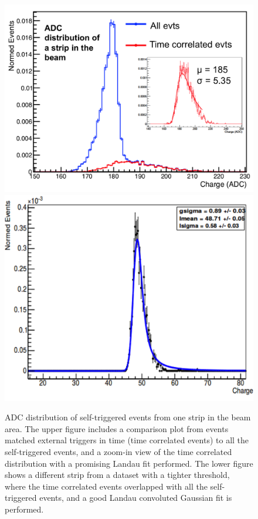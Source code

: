 \documentclass[journal]{IEEEtran}
\begin{document}
\begin{figure}[!ht]%
  \centering
  \includegraphics[width=0.8\linewidth]{pics/Res_pic2.png}\\
  \includegraphics[width=0.78\linewidth]{pics/Res_pic3_1.png}
  \caption{
  ADC distribution of self-triggered events from one strip in the beam area.
  The upper figure includes a comparison plot from events matched external triggers in time (time correlated events) to all the self-triggered events,
  and a zoom-in view of the time correlated distribution with a promising Landau fit performed.
  The lower figure shows a different strip from a dataset with a tighter threshold, where the time correlated events overlapped with all the self-triggered events,
  and a good Landau convoluted Gaussian fit is performed.
  }%
\label{fig:res2}%
\end{figure}

\end{document}
